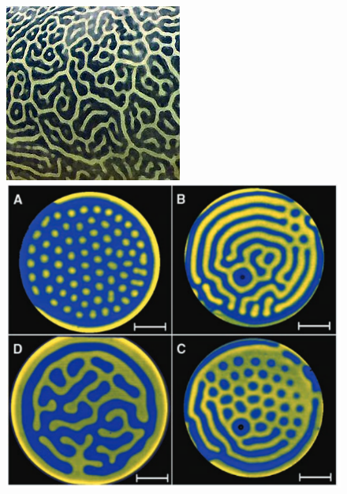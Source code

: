 \documentclass[../main]{subfiles}
\begin{document}
\begin{figure}
    \begin{minipage}{0.49\textwidth}
        \includegraphics[width=\textwidth]{220px-Giant_Pufferfish_skin_pattern_detail}
    \end{minipage}
    \begin{minipage}{0.49\textwidth}
        \includegraphics[width=\textwidth]{turing_pattern_chem.pdf}
    \end{minipage}
\end{figure}
\end{document}

